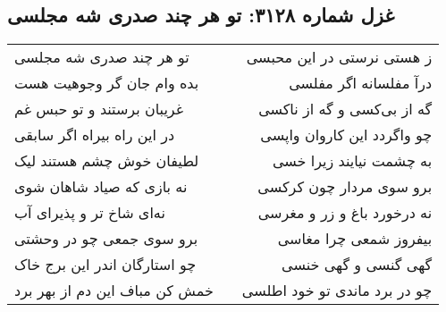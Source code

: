 \begin{center}
\section*{غزل شماره ۳۱۲۸: تو هر چند صدری شه مجلسی}
\label{sec:3128}
\begin{longtable}{l p{0.5cm} r}
تو هر چند صدری شه مجلسی
&&
ز هستی نرستی در این محبسی
\\
بده وام جان گر وجوهیت هست
&&
درآ مفلسانه اگر مفلسی
\\
غریبان برستند و تو حبس غم
&&
گه از بی‌کسی و گه از ناکسی
\\
در این راه بیراه اگر سابقی
&&
چو واگردد این کاروان واپسی
\\
لطیفان خوش چشم هستند لیک
&&
به چشمت نیایند زیرا خسی
\\
نه بازی که صیاد شاهان شوی
&&
برو سوی مردار چون کرکسی
\\
نه‌ای شاخ تر و پذیرای آب
&&
نه درخورد باغ و زر و مغرسی
\\
برو سوی جمعی چو در وحشتی
&&
بیفروز شمعی چرا مغاسی
\\
چو استارگان اندر این برج خاک
&&
گهی گنسی و گهی خنسی
\\
خمش کن مباف این دم از بهر برد
&&
چو در برد ماندی تو خود اطلسی
\\
\end{longtable}
\end{center}
